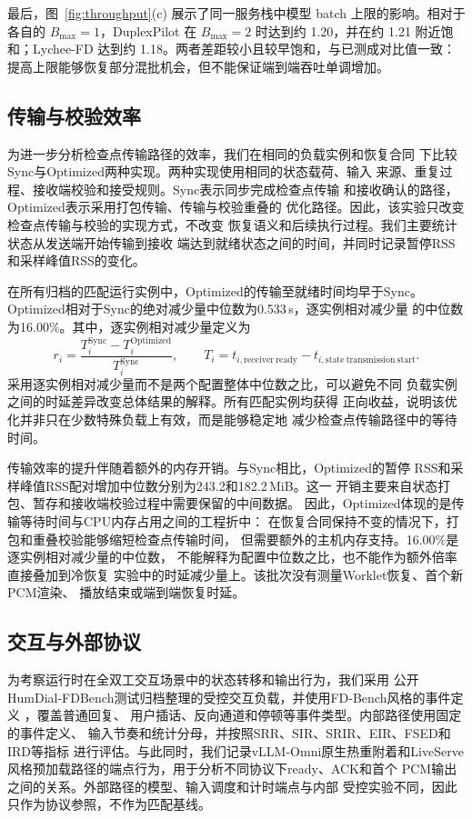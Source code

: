 \documentclass{article}
\begin{document}
最后，图~\ref{fig:throughput}(c) 展示了同一服务栈中模型 batch 上限的影响。相对于各自的 $B_{\max}=1$，DuplexPilot 在 $B_{\max}=2$ 时达到约 1.20，并在约 1.21 附近饱和；Lychee-FD 达到约 1.18。两者差距较小且较早饱和，与已测成对比值一致：提高上限能够恢复部分混批机会，但不能保证端到端吞吐单调增加。

\subsection{传输与校验效率}
\label{sec:transfer}

为进一步分析检查点传输路径的效率，我们在相同的负载实例和恢复合同
下比较Sync与Optimized两种实现。两种实现使用相同的状态载荷、输入
来源、重复过程、接收端校验和接受规则。Sync表示同步完成检查点传输
和接收确认的路径，Optimized表示采用打包传输、传输与校验重叠的
优化路径。因此，该实验只改变检查点传输与校验的实现方式，不改变
恢复语义和后续执行过程。我们主要统计状态从发送端开始传输到接收
端达到就绪状态之间的时间，并同时记录暂停RSS和采样峰值RSS的变化。

在所有归档的匹配运行实例中，Optimized的传输至就绪时间均早于Sync。
Optimized相对于Sync的绝对减少量中位数为0.533\,s，逐实例相对减少量
的中位数为16.00\%。其中，逐实例相对减少量定义为
\[
    r_i =
    \frac{T_i^{\mathrm{Sync}}-T_i^{\mathrm{Optimized}}}
      {T_i^{\mathrm{Sync}}},
    \qquad
    T_i=t_{i,\mathrm{receiver\ ready}}-t_{i,\mathrm{state\ transmission\ start}}.
\]
采用逐实例相对减少量而不是两个配置整体中位数之比，可以避免不同
负载实例之间的时延差异改变总体结果的解释。所有匹配实例均获得
正向收益，说明该优化并非只在少数特殊负载上有效，而是能够稳定地
减少检查点传输路径中的等待时间。

传输效率的提升伴随着额外的内存开销。与Sync相比，Optimized的暂停
RSS和采样峰值RSS配对增加中位数分别为243.2和182.2\,MiB。这一
开销主要来自状态打包、暂存和接收端校验过程中需要保留的中间数据。
因此，Optimized体现的是传输等待时间与CPU内存占用之间的工程折中：
在恢复合同保持不变的情况下，打包和重叠校验能够缩短检查点传输时间，
但需要额外的主机内存支持。16.00\%是逐实例相对减少量的中位数，
不能解释为配置中位数之比，也不能作为额外倍率直接叠加到冷恢复
实验中的时延减少量上。该批次没有测量Worklet恢复、首个新PCM渲染、
播放结束或端到端恢复时延。

\subsection{交互与外部协议}
\label{sec:interaction}

为考察运行时在全双工交互场景中的状态转移和输出行为，我们采用
公开HumDial-FDBench测试归档整理的受控交互负载，并使用FD-Bench风格的事件定义
\citep{humdialdataset2026,fdbench2025}，覆盖普通回复、
用户插话、反向通道和停顿等事件类型。内部路径使用固定的事件定义、
输入节奏和统计分母，并按照SRR、SIR、SRIR、EIR、FSED和IRD等指标
进行评估。与此同时，我们记录vLLM-Omni原生热重附着和LiveServe
风格预加载路径的端点行为，用于分析不同协议下ready、ACK和首个
PCM输出之间的关系。外部路径的模型、输入调度和计时端点与内部
受控实验不同，因此只作为协议参照，不作为匹配基线。
\end{document}
